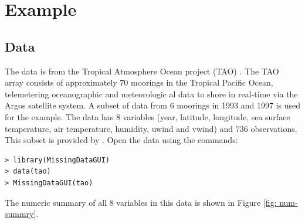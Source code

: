 \documentclass[english]{article}
\begin{document}

\section{Example}


\subsection{Data}
The data is from the Tropical Atmosphere Ocean project (TAO) \citep{tao}. The TAO array consists of approximately 70 moorings in the Tropical Pacific Ocean, telemetering oceanographic and meteorologic al data to shore in real-time via the Argos satellite system. A subset of data from 6 moorings in 1993 and 1997 is used for the example. The data has 8 variables (year, latitude, longitude, sea surface temperature, air temperature, humidity, uwind and vwind) and 736 observations. This subset is provided by \citet{CS07}. Open the data using the commands:

\begin{verbatim}
> library(MissingDataGUI)
> data(tao)
> MissingDataGUI(tao)
\end{verbatim}

The numeric summary of all 8 variables in this data is shown in Figure \ref{fig: num-summry}.

\end{document}
